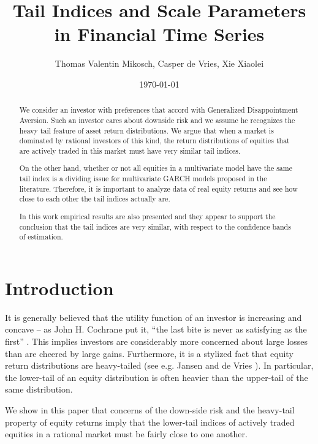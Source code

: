 \documentclass{article}
\title{Tail Indices and Scale Parameters in Financial Time Series}
\author{Thomas Valentin Mikosch, Casper de Vries, Xie Xiaolei}
\date{\today}
\newcommand{\1}[1]{
  \mathbf{1}_{\{#1\}}
}
\begin{document}
\maketitle

\begin{abstract}
We consider an investor with preferences that accord with Generalized
Disappointment Aversion. Such an investor cares about downside risk and
we assume he recognizes the heavy tail feature of asset return
distributions. We argue that when a market is dominated by rational
investors of this kind, the return distributions of equities that are
actively traded in this market must have very similar tail indices.

On the other hand, whether or not all equities in a multivariate model
have the same tail index is a dividing issue for multivariate GARCH
models proposed in the literature. Therefore, it is important to analyze
data of real equity returns and see how close to each other the
tail indices actually are.

In this work empirical results are also presented and they appear
to support the conclusion that the tail indices are very similar,
with respect to the confidence bands of estimation.
\end{abstract}

\section{Introduction}
It is generally believed that the utility function of an
investor is increasing and concave -- as John H. Cochrane
put it, ``the last bite is never as satisfying as the first''
\cite{cochrane2009asset}. This implies investors are considerably
more concerned about large losses than are cheered by large gains.
Furthermore, it is a stylized fact that equity return distributions
are heavy-tailed (see e.g. Jansen and de Vries \cite{jansen1991frequency}).
In particular, the lower-tail of an equity distribution is often heavier
than the upper-tail of the same distribution.

We show in this paper that concerns of the down-side risk and the
heavy-tail property of equity returns  imply that the lower-tail indices
of actively traded equities in a rational market must be fairly close to
one another.

\end{document}
